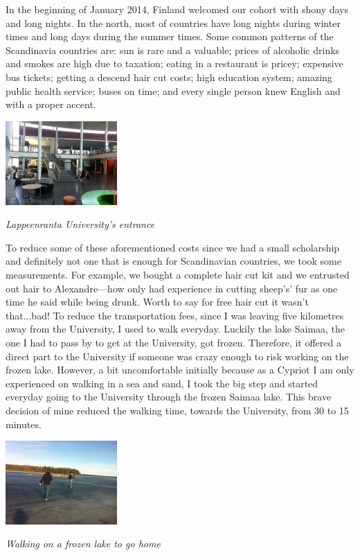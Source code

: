 \documentclass[10pt,a4paper]{article} %
\begin{document}
\begin{multicols}{3}
   
In the beginning of January 2014, Finland welcomed our cohort with shony days 
and long nights. 
In the north, most of countries have long nights during winter times and long 
days during the summer times. 
Some common patterns of the Scandinavia countries are: sun is rare and a valuable; 
prices of alcoholic drinks and smokes are high due to taxation; eating in a 
restaurant is pricey; expensive bus tickets; getting a descend hair cut costs; 
high education system; amazing public health service; buses on time; 
and every single person knew English and with a proper accent.
     

\begin{center}
	\includegraphics[width=0.32\textwidth]{media/entrance_university.jpg}
	\par\textit{Lappeenranta University's entrance}
\end{center}


To reduce some of these aforementioned costs since we had a small scholarship and 
definitely not one that is enough for Scandinavian countries, we took some 
measurements. 
For example, we bought a complete hair cut kit and we entrusted out hair to 
Alexandre---how only had experience in cutting sheep's' fur as one time he said 
while being drunk.  
Worth to say for free hair cut it wasn't that...bad! 
To reduce the transportation fees, since I was leaving five kilometres away from 
the University, I used to walk everyday. 
Luckily the lake Saimaa, the one I had to pass by to get at the University, got 
frozen. 
Therefore, it offered a direct part to the University if someone was crazy enough 
to risk working on the frozen lake. 
However, a bit uncomfortable initially because as a Cypriot I am only experienced 
on walking in a sea and sand, I took the big step and started everyday 
going to the University through the frozen Saimaa lake.
This brave decision of mine reduced the walking time, towards the University, from 
30 to 15 minutes.


\begin{center}
	\includegraphics[width=0.32\textwidth]{media/walking_on_ice.jpg}
	\par\textit{Walking on a frozen lake to go home}
\end{center}



\end{multicols}
\end{document}
